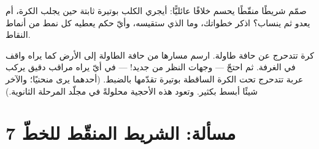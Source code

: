 \begin{exercise}[$\star\star$]\label{exo:g6:describing-motion:11}
صمّم شريطًا منقّطًا يحسم خلافًا عائليًّا: أيجري الكلب بوتيرة
ثابتة حين يجلب الكرة، أم يعدو ثم ينساب؟ اذكر خطواتك، وما الذي
ستقيسه، وأيّ حكم يعطيه كل نمط من أنماط النقاط.
\end{exercise}

\begin{exercise}[$\star\star\star$]\label{exo:g6:describing-motion:12}
كرة تتدحرج عن حافة طاولة. ارسم مسارها من حافة الطاولة إلى
الأرض كما يراه واقف في الغرفة. ثم احتجّ --- وجهات النظر من
جديد! --- في أيّ  يراه مراقب دقيق يركب عربة تتدحرج تحت
الكرة الساقطة بوتيرة تقدّمها بالضبط. (أحدهما يرى منحنيًا؛
والآخر شيئًا أبسط بكثير. وتعود هذه الأحجية محلولةً في مجلّد
المرحلة الثانوية.)
\end{exercise}

\section{مسألة: الشريط المنقّط للخطّ 7}

